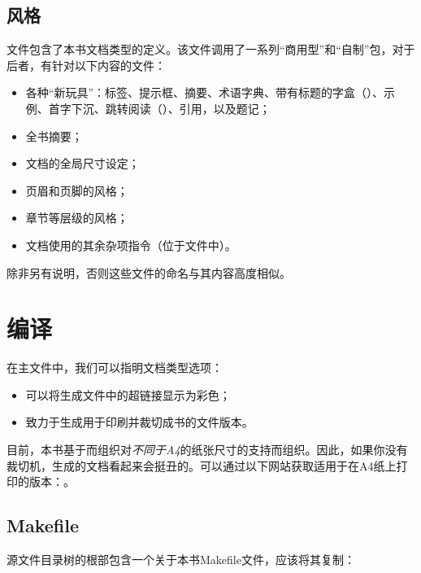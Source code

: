 \subsection{风格}

文件包含了本书文档类型的定义。该文件调用了一系列``商用型''和``自制''包，对于后者，有针对以下内容的文件：

\begin{itemize}
    \item 各种``新玩具''：标签、提示框、摘要、术语字典、带有标题的字盒（）、示例、首字下沉、跳转阅读（）、引用，以及题记；
    \item 全书摘要；
    \item 文档的全局尺寸设定；
    \item 页眉和页脚的风格；
    \item 章节等层级的风格；
    \item 文档使用的其余杂项指令（位于文件中）。
\end{itemize}

除非另有说明，否则这些文件的命名与其内容高度相似。

\section{编译}

在主文件中，我们可以指明文档类型选项：

\begin{itemize}
    \item {}可以将生成文件中的超链接显示为彩色；
    \item {}致力于生成用于印刷并裁切成书的文件版本。
\end{itemize}

\begin{exclamation}
目前，本书基于而组织对\emph{不同于A4}的纸张尺寸的支持而组织。因此，如果你没有裁切机，生成的文档看起来会挺丑的。可以通过以下网站获取适用于在A4纸上打印的版本：。
\end{exclamation}

\subsection{Makefile}

源文件目录树的根部包含一个关于本书Makefile文件，应该将其复制：


